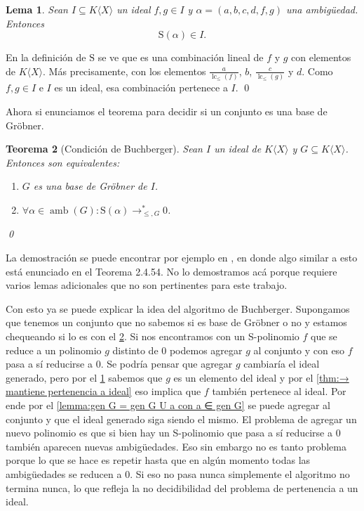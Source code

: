\documentclass[12pt]{report}
\theoremstyle{customstyle}
\newtheorem{theorem}{Teorema}[chapter]
\newtheorem{lemma}[theorem]{Lema}
\renewenvironment{proof}[1][\proofname]{{\noindent \bfseries #1: }}{\qed} %
\theoremstyle{factstyle}
\DeclareMathOperator{\lc}{lc}
\DeclareMathOperator{\amb}{amb}
\renewcommand{\S}{\text{S}}
\begin{document}
\begin{lemma}\label{lemma:S es cerrado en ideal}
  Sean $I ⊆ K⟨X⟩$ un ideal $f, g ∈ I$ y $α = (a, b, c, d, f, g)$ una ambigüedad. Entonces
  \[ \S(α) ∈ I \text{.}\]
\end{lemma}
\begin{proof}
  En la definición de $\S$ se ve que es una combinación lineal de $f$ y $g$ con elementos de $K⟨X⟩$. Más precisamente, con los elementos $\frac{a}{\lc_≤{(f)}}$, $b$, $\frac{c}{\lc_≤{(g)}}$ y $d$. Como $f, g ∈ I$ e $I$ es un ideal, esa combinación pertenece a $I$.
\end{proof}

Ahora si enunciamos el teorema para decidir si un conjunto es una base de Gröbner.

\begin{theorem}[Condición de Buchberger]\label{thm:condición de Buchberger}
  Sean $I$ un ideal de $K⟨X⟩$ y $G ⊆ K⟨X⟩$. Entonces son equivalentes:
  \begin{enumerate}
    \item $G$ es una base de Gröbner de $I$.
    \item $∀α ∈ \amb(G) : \S(α) →^*_{≤, G} 0$.
  \end{enumerate}
  \qed
\end{theorem}

La demostración se puede encontrar por ejemplo en \cite{phdthesis:Hof23}, en donde algo similar a esto está enunciado en el Teorema 2.4.54. No lo demostramos acá porque requiere varios lemas adicionales que no son pertinentes para este trabajo.

Con esto ya se puede explicar la idea del algoritmo de Buchberger. Supongamos que tenemos un conjunto que no sabemos si es base de Gröbner o no y estamos chequeando si lo es con el \cref{thm:condición de Buchberger}. Si nos encontramos con un S-polinomio $f$ que se reduce a un polinomio $g$ distinto de $0$ podemos agregar $g$ al conjunto y con eso $f$ pasa a sí reducirse a $0$. Se podría pensar que agregar $g$ cambiaría el ideal generado, pero por el \cref{lemma:S es cerrado en ideal} sabemos que $g$ es un elemento del ideal y por el \cref{thm:→ mantiene pertenencia a ideal} eso implica que $f$ también pertenece al ideal. Por ende por el \cref{lemma:gen G = gen G U a con a ∈ gen G} se puede agregar al conjunto y que el ideal generado siga siendo el mismo. El problema de agregar un nuevo polinomio es que si bien hay un S-polinomio que pasa a sí reducirse a $0$ también aparecen nuevas ambigüedades. Eso sin embargo no es tanto problema porque lo que se hace es repetir hasta que en algún momento todas las ambigüedades se reducen a $0$. Si eso no pasa nunca simplemente el algoritmo no termina nunca, lo que refleja la no decidibilidad del problema de pertenencia a un ideal.
\end{document}
